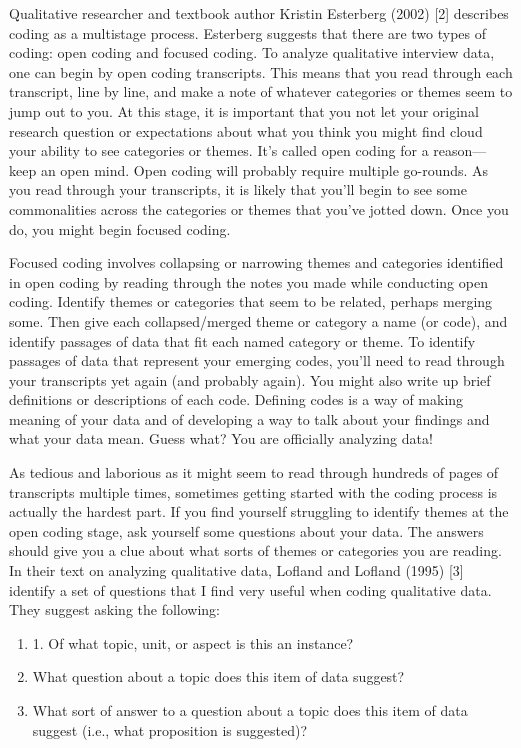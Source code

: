 Qualitative researcher and textbook author Kristin Esterberg (2002) [2] describes coding as a multistage process. Esterberg suggests that there are two types of coding: open coding and focused coding. To analyze qualitative interview data, one can begin by open coding transcripts. This means that you read through each transcript, line by line, and make a note of whatever categories or themes seem to jump out to you. At this stage, it is important that you not let your original research question or expectations about what you think you might find cloud your ability to see categories or themes. It’s called open coding for a reason—keep an open mind. Open coding will probably require multiple go-rounds. As you read through your transcripts, it is likely that you’ll begin to see some commonalities across the categories or themes that you’ve jotted down. Once you do, you might begin focused coding.

Focused coding involves collapsing or narrowing themes and categories identified in open coding by reading through the notes you made while conducting open coding. Identify themes or categories that seem to be related, perhaps merging some. Then give each collapsed/merged theme or category a name (or code), and identify passages of data that fit each named category or theme. To identify passages of data that represent your emerging codes, you’ll need to read through your transcripts yet again (and probably again). You might also write up brief definitions or descriptions of each code. Defining codes is a way of making meaning of your data and of developing a way to talk about your findings and what your data mean. Guess what? You are officially analyzing data!

As tedious and laborious as it might seem to read through hundreds of pages of transcripts multiple times, sometimes getting started with the coding process is actually the hardest part. If you find yourself struggling to identify themes at the open coding stage, ask yourself some questions about your data. The answers should give you a clue about what sorts of themes or categories you are reading. In their text on analyzing qualitative data, Lofland and Lofland (1995) [3] identify a set of questions that I find very useful when coding qualitative data. They suggest asking the following:

\begin{enumerate}
	\item 1. Of what topic, unit, or aspect is this an instance?
	\item What question about a topic does this item of data suggest?
	\item What sort of answer to a question about a topic does this item of data suggest (i.e., what proposition is suggested)?
\end{enumerate}

